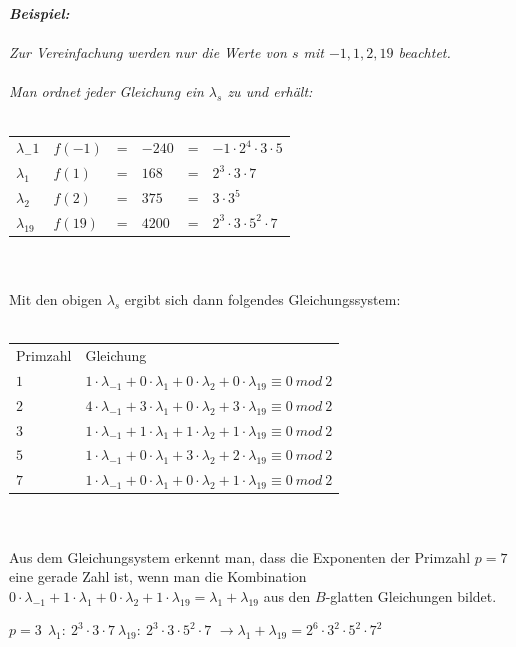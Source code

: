 \documentclass[10pt, bigheadings]{scrartcl}
\begin{document}
{\it
\textbf{Beispiel:}\\\\
Zur Vereinfachung werden nur die Werte von $s$ mit $-1, 1, 2, 19$ beachtet.\\\\
Man ordnet jeder Gleichung ein $\lambda_s$ zu und erhält:\\\\
\begin{tabular}{llllll}
$\lambda_-1$ & $f(-1)$ & = & $-240$ & = & $-1\cdot2^4\cdot3\cdot5$\\
$\lambda_1$ & $f(1)$ & = & $168 $ & = & $ 2^3\cdot3\cdot7$\\
$\lambda_2$ & $f(2)$ & = & $ 375 $ & = & $ 3\cdot3^5$\\
$\lambda_19$ & $f(19) $ & = & $ 4200 $ & = & $2^3\cdot3\cdot5^2\cdot7$\\
\end{tabular}\\\\
Mit den obigen $\lambda_s$ ergibt sich dann folgendes
Gleichungssystem:\\\\
\begin{tabular}{ll}
Primzahl & Gleichung\\
$1$ & $1\cdot \lambda_{-1}+0\cdot \lambda_{1} +0\cdot \lambda_{2} + 0\cdot \lambda_{19} \equiv 0\ mod\ 2  $\\
$2$ & $4\cdot \lambda_{-1}+3\cdot \lambda_{1} +0\cdot \lambda_{2} + 3\cdot \lambda_{19} \equiv 0\ mod\ 2  $\\
$3$ & $1\cdot \lambda_{-1}+1\cdot \lambda_{1} +1\cdot \lambda_{2} + 1\cdot \lambda_{19} \equiv 0\ mod\ 2  $\\
$5$ & $1\cdot \lambda_{-1}+0\cdot \lambda_{1} +3\cdot \lambda_{2} + 2\cdot \lambda_{19} \equiv 0\ mod\ 2  $\\
$7$ & $1\cdot \lambda_{-1}+0\cdot \lambda_{1} +0\cdot \lambda_{2} + 1\cdot \lambda_{19} \equiv 0\ mod\ 2  $\\
\end{tabular}\\\\
Aus dem Gleichungsystem erkennt man, dass die Exponenten der Primzahl $p=7$ eine
gerade Zahl ist, wenn man die Kombination
$0\cdot \lambda_{-1}+1\cdot \lambda_{1} +0\cdot
\lambda_{2} + 1\cdot \lambda_{19} = \lambda_{1} + \lambda_{19}$
aus den $B$-glatten Gleichungen bildet.
\begin{center}
$p=3\ \ \lambda_1:\ 2^3\cdot3\cdot7\
\lambda_{19}:\ 2^3\cdot3\cdot5^2\cdot7$ $\rightarrow
\lambda_{1} + \lambda_{19} = 2^6\cdot3^2\cdot5^2\cdot7^2$
\end{center}
}
\end{document}
